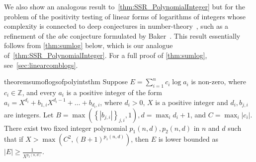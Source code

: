 \documentclass[a4paper, 11pt,dvipsnames]{article}
\newcommand\abs[1]{\left|#1\right|}
\newcommand{\ord}{\operatorname{ord}}
\begin{document}
We also show an analogous result to~\cref{thm:SSR_PolynomialInteger} but for the problem of the positivity testing of linear forms of
  logarithms of integers whose complexity is connected to deep conjectures in number-theory~\cite{etessami2014note}, such as a refinement of the
  $abc$ conjecture formulated by Baker~\cite{baker1998logarithmic}. This result essentially follows from \cref{thm:sumlog} below, which is our analogue of~\cref{thm:SSR_PolynomialInteger}. For a full proof of \cref{thm:sumlog}, see~\cref{sec:linearcomblogs}.

  \begin{restatable}{theorem}{sumoflogsofpolyintsthm}  \label{thm:sumlog} 
  Suppose $E = \sum_{i=1}^n c_i \log{a_i}$ is non-zero, where $c_i \in \mathbb{Z}$, and every $a_i$ is a
  positive integer of the form $a_i = X^{d_i} + b_{1,i}X^{d_i - 1 } + \dots + b_{d_i,i}$, where $d_i > 0$, $X$ is a positive integer and $d_i,b_{j,i}$ are
  integers. Let $B = \max \left( \left\{\abs{b_{j,i}} \right\}_{j,i}, 1 \right), d = \max_i d_i + 1$, and $C = \max_i \left| c_i \right|$. 
    There exist two fixed integer polynomial $p_1(n,d), p_2(n,d)$ in $n$ and $d$ such that if $X > \max \left( C^2, (B+1)^{p_1(n,d)} \right)$, then $E$ is lower bounded as $\abs{E} \ge \frac{1}{X^{p_2(n,d)}}$.
\end{restatable}

\end{document}
